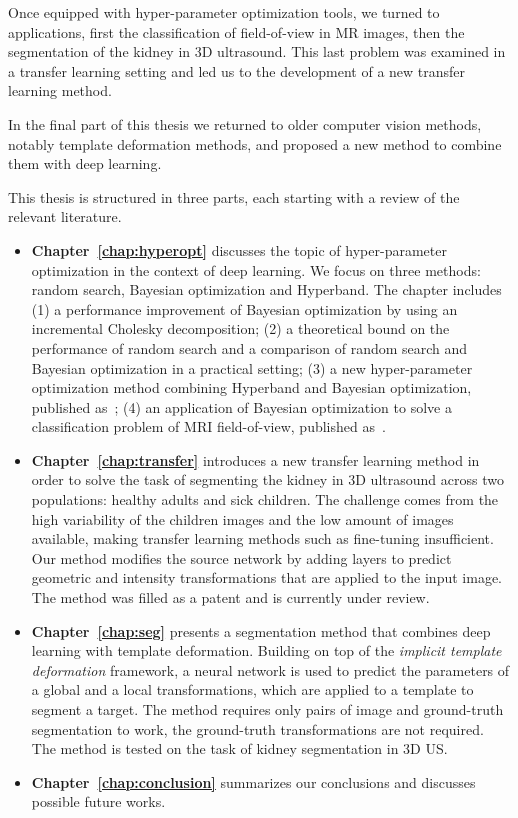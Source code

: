 Once equipped with hyper-parameter optimization tools, we turned to applications, first the classification of field-of-view in MR images, then the segmentation of the kidney in 3D ultrasound. This last problem was examined in a transfer learning setting and led us to the development of a new transfer learning method. 

In the final part of this thesis we returned to older computer vision methods, notably template deformation methods, and proposed a new method to combine them with deep learning.

This thesis is structured in three parts, each starting with a review of the relevant literature. 

\begin{itemize}
    \item \textbf{Chapter~\ref{chap:hyperopt}} discusses the topic of hyper-parameter optimization in the context of deep learning. We focus on three methods: random search, Bayesian optimization and Hyperband. The chapter includes (1) a performance improvement of Bayesian optimization by using an incremental Cholesky decomposition; (2) a theoretical bound on the performance of random search and a comparison of random search and Bayesian optimization in a practical setting; (3) a new hyper-parameter optimization method combining Hyperband and Bayesian optimization, published as~\textcite{bertrand2017CAp}; (4) an application of Bayesian optimization to solve a classification problem of MRI field-of-view, published as~\textcite{bertrand2017ISBI}.
    \item \textbf{Chapter~\ref{chap:transfer}} introduces a new transfer learning method in order to solve the task of segmenting the kidney in 3D ultrasound across two populations: healthy adults and sick children. The challenge comes from the high variability of the children images and the low amount of images available, making transfer learning methods such as fine-tuning insufficient. Our method modifies the source network by adding layers to predict geometric and intensity transformations that are applied to the input image. The method was filled as a patent and is currently under review.
    \item \textbf{Chapter~\ref{chap:seg}} presents a segmentation method that combines deep learning with template deformation. Building on top of the \textit{implicit template deformation} framework, a neural network is used to predict the parameters of a global and a local transformations, which are applied to a template to segment a target. The method requires only pairs of image and ground-truth segmentation to work, the ground-truth transformations are not required. The method is tested on the task of kidney segmentation in 3D US.
    \item \textbf{Chapter~\ref{chap:conclusion}} summarizes our conclusions and discusses possible future works.
\end{itemize}
